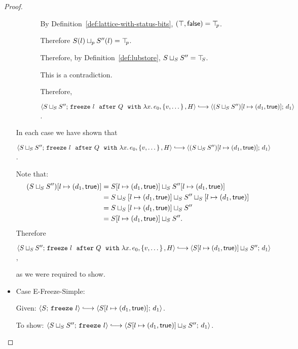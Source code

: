 \begin{proof}
\begin{itemize}
\begin{itemize}
\begin{itemize}
          By Definition~\ref{def:lattice-with-status-bits},
          $(\top, \textsf{false}) = \top\hspace{-0.85mm}_{p}$.

          Therefore $S(l) \sqcup_p S''(l) = \top\hspace{-0.85mm}_{p}$.

          Therefore, by Definition~\ref{def:lubstore},
          $S \sqcup_{S} S'' = \top\hspace{-0.85mm}_{S}$.

          This is a contradiction.

          Therefore,

          $\config{\lubstore{S}{S''}}{\freezeafterfull{l}{Q}{\lam{x}{e_0}}{\setof{v,
                \dots}}{H}} \parstepsto
          \config{\extS{(\lubstore{S}{S''})}{l}{d_1}{\frozentrue}}{d_1}$.
        \end{itemize}
      \end{itemize}

      In each case we have shown that

      $\config{\lubstore{S}{S''}}{\freezeafterfull{l}{Q}{\lam{x}{e_0}}{\setof{v,
            \dots}}{H}} \parstepsto
      \config{\extS{(\lubstore{S}{S''})}{l}{d_1}{\frozentrue}}{d_1}$.

      Note that:
      \begin{align*}
        (S \sqcup_{S} S'')[l \mapsto (d_1, \textsf{true})] &=
        S[l \mapsto (d_1, \textsf{true})] \sqcup_{S} S''[l \mapsto (d_1, \textsf{true})] \\
        &= S \sqcup_{S} \left[ l \mapsto (d_1, \textsf{true}) \right] \sqcup_{S} S'' \sqcup_{S} \left[ l \mapsto (d_1, \textsf{true}) \right] \\
        &= S \sqcup_{S} \left[ l \mapsto (d_1, \textsf{true}) \right] \sqcup_{S} S'' \\
        &= S[l \mapsto (d_1, \textsf{true})] \sqcup_{S} S''.
      \end{align*}
      Therefore

      $\config{\lubstore{S}{S''}}{\freezeafterfull{l}{Q}{\lam{x}{e_0}}{\setof{v,
            \dots}}{H}} \parstepsto
      \config{\lubstore{\extS{S}{l}{d_1}{\frozentrue}}{S''}}{d_1}$,

      as we were required to show.

    \item Case {\sc E-Freeze-Simple}:

      Given: $\config{S}{\freeze{l}} \parstepsto
      \config{\extS{S}{l}{d_1}{\frozentrue}}{d_1}$.

      To show: $\config{\lubstore{S}{S''}}{\freeze{l}}
      \parstepsto
      \config{\lubstore{\extS{S}{l}{d_1}{\frozentrue}}{S''}}{d_1}$.


\end{itemize}
\end{proof}

